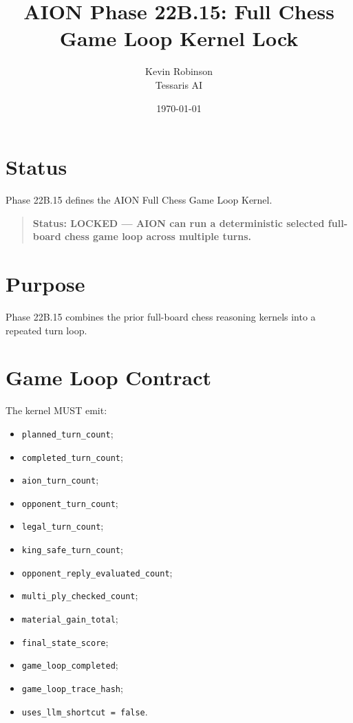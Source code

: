 \documentclass[11pt,a4paper]{article}
\title{\textbf{AION Phase 22B.15: Full Chess Game Loop Kernel Lock}}
\author{Kevin Robinson\\Tessaris AI}
\date{\today}
\begin{document}
\maketitle

\section{Status}

Phase 22B.15 defines the AION Full Chess Game Loop Kernel.

\begin{quote}
\textbf{Status: LOCKED --- AION can run a deterministic selected full-board chess game loop across multiple turns.}
\end{quote}

\section{Purpose}

Phase 22B.15 combines the prior full-board chess reasoning kernels into a repeated turn loop.

\section{Game Loop Contract}

The kernel MUST emit:

\begin{itemize}
  \item \texttt{planned\_turn\_count};
  \item \texttt{completed\_turn\_count};
  \item \texttt{aion\_turn\_count};
  \item \texttt{opponent\_turn\_count};
  \item \texttt{legal\_turn\_count};
  \item \texttt{king\_safe\_turn\_count};
  \item \texttt{opponent\_reply\_evaluated\_count};
  \item \texttt{multi\_ply\_checked\_count};
  \item \texttt{material\_gain\_total};
  \item \texttt{final\_state\_score};
  \item \texttt{game\_loop\_completed};
  \item \texttt{game\_loop\_trace\_hash};
  \item \texttt{uses\_llm\_shortcut = false}.
\end{itemize}
\end{document}
